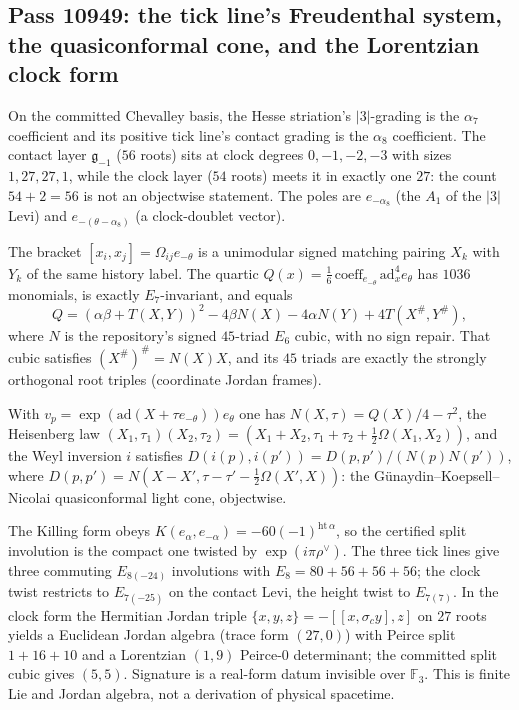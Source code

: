 \subsection{Pass 10949: the tick line's Freudenthal system, the quasiconformal cone, and the Lorentzian clock form}

On the committed Chevalley basis, the Hesse striation's $|3|$-grading is the
$\alpha_7$ coefficient and its positive tick line's contact grading is the
$\alpha_8$ coefficient.  The contact layer $\mathfrak g_{-1}$ ($56$ roots) sits at
clock degrees $0,-1,-2,-3$ with sizes $1,27,27,1$, while the clock layer ($54$
roots) meets it in exactly one $27$: the count $54+2=56$ is not an objectwise
statement.  The poles are $e_{-\alpha_8}$ (the $A_1$ of the $|3|$ Levi) and
$e_{-(\theta-\alpha_8)}$ (a clock-doublet vector).

The bracket $[x_i,x_j]=\Omega_{ij}e_{-\theta}$ is a unimodular signed matching
pairing $X_k$ with $Y_k$ of the same history label.  The quartic
$Q(x)=\tfrac16\,\mathrm{coeff}_{e_{-\theta}}\,\mathrm{ad}_x^4e_\theta$ has $1036$
monomials, is exactly $E_7$-invariant, and equals
\[
Q=(\alpha\beta+T(X,Y))^2-4\beta N(X)-4\alpha N(Y)+4T(X^\#,Y^\#),
\]
where $N$ is the repository's signed $45$-triad $E_6$ cubic, with no sign repair.
That cubic satisfies $(X^\#)^\#=N(X)X$, and its $45$ triads are exactly the
strongly orthogonal root triples (coordinate Jordan frames).

With $v_p=\exp(\mathrm{ad}(X+\tau e_{-\theta}))e_\theta$ one has
$N(X,\tau)=Q(X)/4-\tau^2$, the Heisenberg law
$(X_1,\tau_1)(X_2,\tau_2)=(X_1+X_2,\tau_1+\tau_2+\tfrac12\Omega(X_1,X_2))$, and the
Weyl inversion $i$ satisfies $D(i(p),i(p'))=D(p,p')/(N(p)N(p'))$, where
$D(p,p')=N(X-X',\tau-\tau'-\tfrac12\Omega(X',X))$: the
G\"unaydin--Koepsell--Nicolai quasiconformal light cone, objectwise.

The Killing form obeys $K(e_\alpha,e_{-\alpha})=-60(-1)^{\mathrm{ht}\,\alpha}$, so the
certified split involution is the compact one twisted by $\exp(i\pi\rho^\vee)$.
The three tick lines give three commuting $E_{8(-24)}$ involutions with
$E_8=80+56+56+56$; the clock twist restricts to $E_{7(-25)}$ on the contact Levi,
the height twist to $E_{7(7)}$.  In the clock form the Hermitian Jordan triple
$\{x,y,z\}=-[[x,\sigma_c y],z]$ on $27$ roots yields a Euclidean Jordan algebra
(trace form $(27,0)$) with Peirce split $1+16+10$ and a Lorentzian $(1,9)$
Peirce-$0$ determinant; the committed split cubic gives $(5,5)$.  Signature is a
real-form datum invisible over $\mathbb F_3$.  This is finite Lie and Jordan
algebra, not a derivation of physical spacetime.
